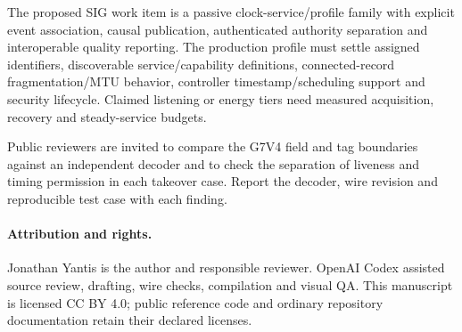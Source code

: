 \documentclass[11pt,letterpaper]{article}
\begin{document}
The proposed SIG work item is a passive clock-service/profile family with explicit event association, causal publication, authenticated authority separation and interoperable quality reporting. The production profile must settle assigned identifiers, discoverable service/capability definitions, connected-record fragmentation/MTU behavior, controller timestamp/scheduling support and security lifecycle. Claimed listening or energy tiers need measured acquisition, recovery and steady-service budgets.

Public reviewers are invited to compare the G7V4 field and tag boundaries against an independent decoder and to check the separation of liveness and timing permission in each takeover case. Report the decoder, wire revision and reproducible test case with each finding.

\paragraph{Attribution and rights.} Jonathan Yantis is the author and responsible reviewer. OpenAI Codex assisted source review, drafting, wire checks, compilation and visual QA. This manuscript is licensed CC BY 4.0; public reference code and ordinary repository documentation retain their declared licenses.
\end{document}
